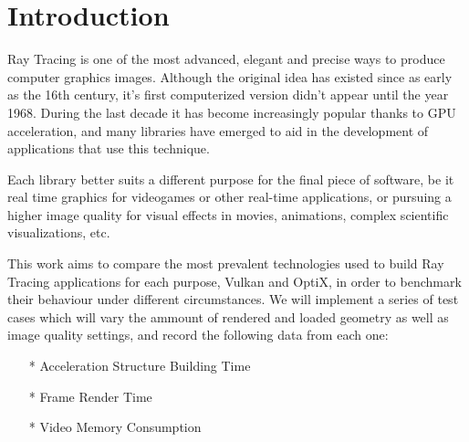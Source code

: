 

\chapter{Introduction}

Ray Tracing is one of the most advanced, elegant and precise ways to produce computer graphics images. Although the original idea has existed since as early as the 16th century, it's first computerized version didn't appear until the year 1968. During the last decade it has become increasingly popular thanks to GPU acceleration, and many libraries have emerged to aid in the development of applications that use this technique.

Each library better suits a different purpose for the final piece of software, be it real time graphics for videogames or other real-time applications, or pursuing a higher image quality for visual effects in movies, animations, complex scientific visualizations, etc.

This work aims to compare the most prevalent technologies used to build Ray Tracing applications for each purpose, Vulkan and OptiX, in order to benchmark their behaviour under different circumstances. We will implement a series of test cases which will vary the ammount of rendered and loaded geometry as well as image quality settings, and record the following data from each one:

\begin{itemize}
    \item[*] Acceleration Structure Building Time
    \item[*] Frame Render Time
    \item[*] Video Memory Consumption
\end{itemize}

